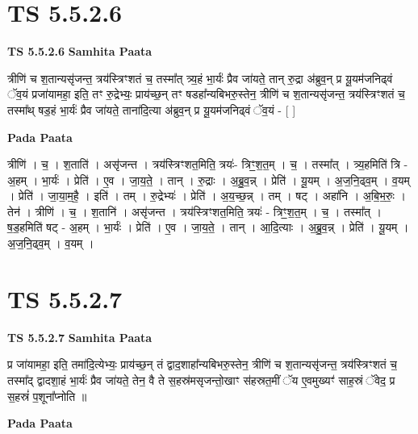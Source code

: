 \documentclass[17pt]{extarticle}
\begin{document}
\section*{ TS 5.5.2.6 }

\textbf{TS 5.5.2.6 } \newline
\textbf{Samhita Paata} \newline

त्रीणि॑ च श॒तान्यसृ॑जन्त॒ त्रय॑स्त्रिꣳशतं च॒ तस्मा᳚त् त्र्य॒हं भा॒र्यः॑ प्रैव जा॑यते॒ तान् रु॒द्रा अ॑ब्रुव॒न् प्र यू॒यम॑जनिढ्वं ॅव॒यं प्रजा॑यामहा॒ इति॒ तꣳ रु॒द्रेभ्यः॒ प्राय॑च्छ॒न् तꣳ षडहा᳚न्यबिभरु॒स्तेन॒ त्रीणि॑ च श॒तान्यसृ॑जन्त॒ त्रय॑स्त्रिꣳशतं च॒ तस्मा᳚थ् षड॒हं भा॒र्यः॑ प्रैव जा॑यते॒ ताना॑दि॒त्या अ॑ब्रुव॒न् प्र यू॒यम॑जनिढ्वं ॅव॒यं - [  ] \newline

\textbf{Pada Paata} \newline

त्रीणि॑ । च॒ । श॒ताति॑ । असृ॑जन्त । त्रय॑स्त्रिꣳशत॒मिति॒ त्रयः॑- त्रिꣳ॒॒श॒त॒म् । च॒ । तस्मा᳚त् । त्र्य॒हमिति॑ त्रि - अ॒हम् । भा॒र्यः॑ । प्रेति॑ । ए॒व । जा॒य॒ते॒ । तान् । रु॒द्राः । अ॒ब्रु॒व॒न्न् । प्रेति॑ । यू॒यम् । अ॒ज॒नि॒ढ्व॒म् । व॒यम् । प्रेति॑ । जा॒या॒म॒है॒ । इति॑ । तम् । रु॒द्रेभ्यः॑ । प्रेति॑ । अ॒य॒च्छ॒न्न् । तम् । षट् । अहा॑नि । अ॒बि॒भ॒रुः॒ । तेन॑ । त्रीणि॑ । च॒ । श॒तानि॑ । असृ॑जन्त । त्रय॑स्त्रिꣳशत॒मिति॒ त्रयः॑ - त्रिꣳ॒॒श॒त॒म् । च॒ । तस्मा᳚त् । ष॒ड॒हमिति॑ षट् - अ॒हम् । भा॒र्यः॑ । प्रेति॑ । ए॒व । जा॒य॒ते॒ । तान् । आ॒दि॒त्याः । अ॒ब्रु॒व॒न्न् । प्रेति॑ । यू॒यम् । अ॒ज॒नि॒ढ्व॒म् । व॒यम् ।  \newline




\section*{ TS 5.5.2.7 }

\textbf{TS 5.5.2.7 } \newline
\textbf{Samhita Paata} \newline

प्र जा॑यामहा॒ इति॒ तमा॑दि॒त्येभ्यः॒ प्राय॑च्छ॒न् तं द्वाद॒शाहा᳚न्यबिभरु॒स्तेन॒ त्रीणि॑ च श॒तान्यसृ॑जन्त॒ त्रय॑स्त्रिꣳशतं च॒ तस्मा᳚द् द्वादशा॒हं भा॒र्यः॑ प्रैव जा॑यते॒ तेन॒ वै ते स॒हस्र॑मसृजन्तो॒खाꣳ स॑हस्रत॒मीं ॅय ए॒वमुख्यꣳ॑ साह॒स्रं ॅवेद॒ प्र स॒हस्रं॑ प॒शूना᳚प्नोति ॥ \newline

\textbf{Pada Paata} \newline
\end{document}

